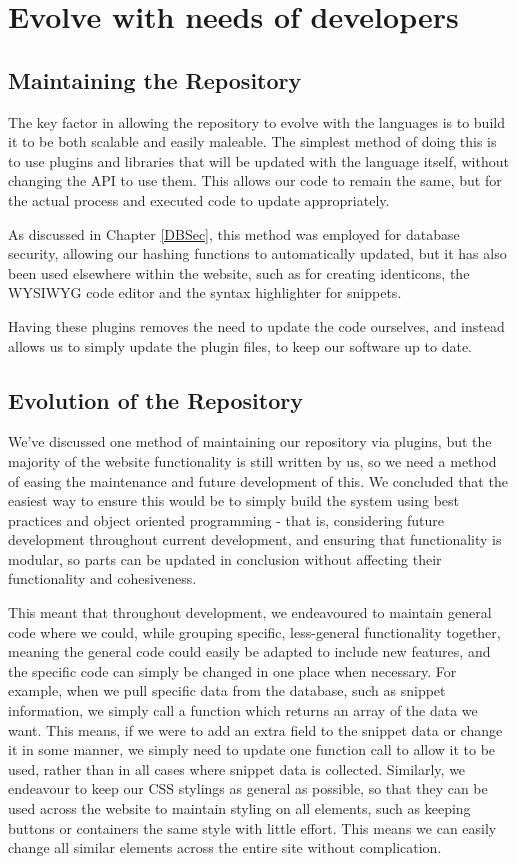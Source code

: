\section{Evolve with needs of developers}
\subsection{Maintaining the Repository}
The key factor in allowing the repository to evolve with the languages is to build it to be both scalable and easily maleable.
The simplest method of doing this is to use plugins and libraries that will be updated with the language itself, without changing the API to use them.
This allows our code to remain the same, but for the actual process and executed code to update appropriately.

As discussed in Chapter \ref{DBSec}, this method was employed for database security, allowing our hashing functions to automatically updated, but it has also been used elsewhere within the website, such as for creating identicons, the WYSIWYG code editor and the syntax highlighter for snippets.

Having these plugins removes the need to update the code ourselves, and instead allows us to simply update the plugin files, to keep our software up to date.

\subsection{Evolution of the Repository}
We've discussed one method of maintaining our repository via plugins, but the majority of the website functionality is still written by us, so we need a method of easing the maintenance and future development of this.
We concluded that the easiest way to ensure this would be to simply build the system using best practices and object oriented programming - that is, considering future development throughout current development, and ensuring that functionality is modular, so parts can be updated in conclusion without affecting their functionality and cohesiveness.

This meant that throughout development, we endeavoured to maintain general code where we could, while grouping specific, less-general functionality together, meaning the general code could easily be adapted to include new features, and the specific code can simply be changed in one place when necessary. 
For example, when we pull specific data from the database, such as snippet information, we simply call a function which returns an array of the data we want.
This means, if we were to add an extra field to the snippet data or change it in some manner, we simply need to update one function call to allow it to be used, rather than in all cases where snippet data is collected.
Similarly, we endeavour to keep our CSS stylings as general as possible, so that they can be used across the website to maintain styling on all elements, such as keeping buttons or containers the same style with little effort.
This means we can easily change all similar elements across the entire site without complication.

